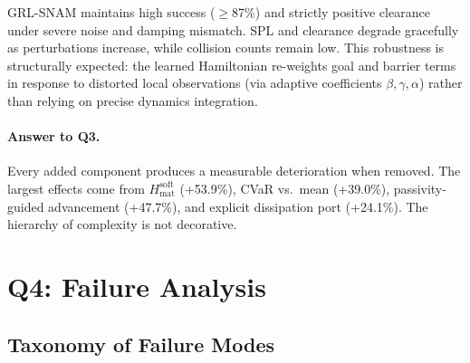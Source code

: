 GRL-SNAM maintains high success ($\geq$87\%) and strictly positive
clearance under severe noise and damping mismatch.
SPL and clearance degrade gracefully as perturbations increase,
while collision counts remain low.
This robustness is structurally expected: the learned Hamiltonian
re-weights goal and barrier terms in response to distorted local
observations (via adaptive coefficients $\beta,\gamma,\alpha$)
rather than relying on precise dynamics integration.

\paragraph{Answer to Q3.}
Every added component produces a measurable deterioration when removed.
The largest effects come from $H_{\mathrm{mat}}^{\mathrm{soft}}$
(+53.9\%), CVaR vs.\ mean (+39.0\%), passivity-guided advancement
(+47.7\%), and explicit dissipation port (+24.1\%).
The hierarchy of complexity is not decorative.

\section{Q4: Failure Analysis}
\label{sec:ch6:failures}

\subsection{Taxonomy of Failure Modes}
\label{subsec:ch6:taxonomy}

